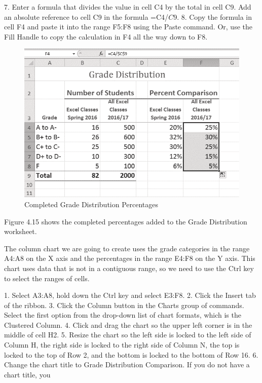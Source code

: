 7. Enter a formula that divides the value in cell C4 by the total in cell C9. Add an absolute reference
to cell C9 in the formula =C4/$C$9.
8. Copy the formula in cell F4 and paste it into the range F5:F8 using the Paste command.
Or, use the Fill Handle to copy the calculation in F4 all the way down to F8.



\begin{figure}[H]
	\centering
	\includegraphics[width=\maxwidth{.95\linewidth}]{gfx/ch04_fig18}
	\caption{Completed Grade Distribution Percentages}
	\label{04:fig18}
\end{figure}




Figure 4.15 shows the completed percentages added to the Grade Distribution worksheet.

The column chart we are going to create uses the grade categories in the range A4:A8 on the X axis
and the percentages in the range E4:F8 on the Y axis. This chart uses data that is not in a contiguous
range, so we need to use the Ctrl key to select the ranges of cells.

1. Select A3:A8, hold down the Ctrl key and select E3:F8.
2. Click the Insert tab of the ribbon.
3. Click the Column button in the Charts group of commands. Select the first option from the
drop-down list of chart formats, which is the Clustered Column.
4. Click and drag the chart so the upper left corner is in the middle of cell H2.
5. Resize the chart so the left side is locked to the left side of Column H, the right side is locked to
the right side of Column N, the top is locked to the top of Row 2, and the bottom is locked to the
bottom of Row 16.
6. Change the chart title to Grade Distribution Comparison. If you do not have a chart title, you



